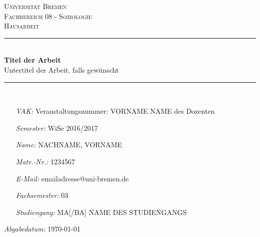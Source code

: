 \begin{titlepage}
\thispagestyle{empty}
\newcommand{\HRule}{\rule{\linewidth}{0.5mm}}
\hspace{1cm}
\center

\textsc{\huge Universität Bremen}\\[2.0cm]
\textsc{\Large Fachbereich 08 - Soziologie}\\[0.8cm]
\MSonehalfspacing
\textsc{\Large Hausarbeit}\\[1.0cm]

\HRule\\[1.4cm]
\MSdoublespacing
{ \huge \bfseries Titel der Arbeit}\\[0.2cm]
{ \large Untertitel der Arbeit, falls gewünscht}\\[0.3cm] %
\HRule \\[2.4cm]
\MSonehalfspacing

\begin{minipage}[t]{0.8\textwidth}
	\begin{itemize}
	\item[\emph{VAK:}] Veranstaltungsnummer: VORNAME NAME des Dozenten
	\item[\emph{Semester:}] WiSe 2016/2017
	\item[\emph{Name:}] NACHNAME, VORNAME
	\item[\emph{Matr.-Nr.:}] 1234567
	\item[\emph{E-Mail:}] emailadresse@uni-bremen.de
	\item[\emph{Fachsemester:}] 03
	\item[\emph{Studiengang:}] MA[/BA] NAME DES STUDIENGANGS
	\end{itemize}
\end{minipage}

\vspace{2.9cm}

\flushright \emph{Abgabedatum:} \today
\end{titlepage}
\restoregeometry

\tableofcontents
{}
\thispagestyle{empty}

\MSonehalfspacing
\newpage
\setcounter{page}{1}
\pagestyle{fancy}